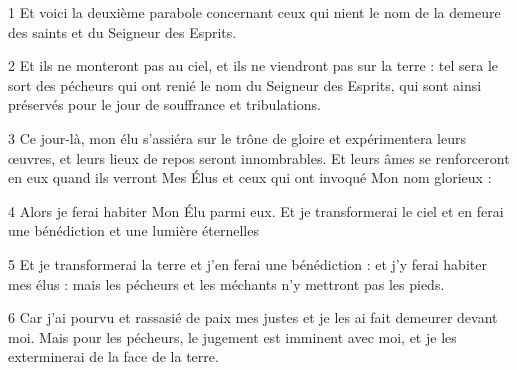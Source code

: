 \par 1 Et voici la deuxième parabole concernant ceux qui nient le nom de la demeure des saints et du Seigneur des Esprits.
\par 2 Et ils ne monteront pas au ciel, et ils ne viendront pas sur la terre : tel sera le sort des pécheurs qui ont renié le nom du Seigneur des Esprits, qui sont ainsi préservés pour le jour de souffrance et tribulations.
\par 3 Ce jour-là, mon élu s'assiéra sur le trône de gloire et expérimentera leurs œuvres, et leurs lieux de repos seront innombrables. Et leurs âmes se renforceront en eux quand ils verront Mes Élus et ceux qui ont invoqué Mon nom glorieux :
\par 4 Alors je ferai habiter Mon Élu parmi eux. Et je transformerai le ciel et en ferai une bénédiction et une lumière éternelles
\par 5 Et je transformerai la terre et j'en ferai une bénédiction : et j'y ferai habiter mes élus : mais les pécheurs et les méchants n'y mettront pas les pieds.
\par 6 Car j'ai pourvu et rassasié de paix mes justes et je les ai fait demeurer devant moi. Mais pour les pécheurs, le jugement est imminent avec moi, et je les exterminerai de la face de la terre.


